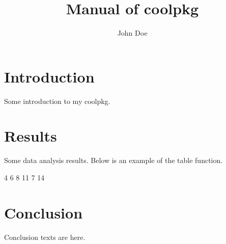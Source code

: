 \documentclass{article}
\title{Manual of coolpkg}
\author{John Doe}
\begin{document}

\maketitle

\section{Introduction}
Some introduction to my coolpkg.

\section{Results}
Some data analysis results. Below is an example of the table function.
\begin{Schunk}
\begin{Soutput}
 4  6  8 
11  7 14 
\end{Soutput}
\end{Schunk}
\section{Conclusion}
Conclusion texts are here.
\end{document}
